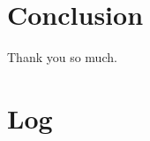 \documentclass[letterpaper, 11pt]{article}
\title{\deliv{\srs}{Interview}}
\date{\datesrs}
\begin{document}
\maketitle
\tableofcontents
\thispagestyle{fancy}

\begin{flushleft}







\section{Conclusion}
Thank you so much.


\section{Log}





\end{flushleft}
\end{document}
